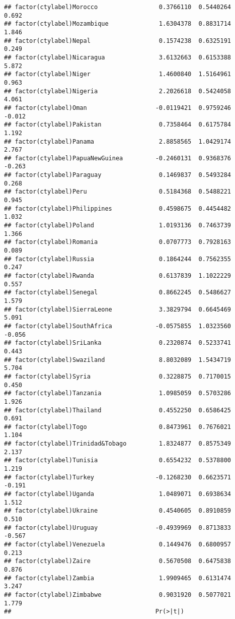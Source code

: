 \documentclass[12pt]{article}\usepackage[]{graphicx}\usepackage[]{color}
\makeatletter
\newenvironment{kframe}{%
 \def\at@end@of@kframe{}%
 \ifinner\ifhmode%
  \def\at@end@of@kframe{\end{minipage}}%
  \begin{minipage}{\columnwidth}%
 \fi\fi%
 \def\FrameCommand##1{\hskip\@totalleftmargin \hskip-\fboxsep
 \colorbox{shadecolor}{##1}\hskip-\fboxsep
     \hskip-\linewidth \hskip-\@totalleftmargin \hskip\columnwidth}%
 \MakeFramed {\advance\hsize-\width
   \@totalleftmargin\z@ \linewidth\hsize
   \@setminipage}}%
 {\par\unskip\endMakeFramed%
 \at@end@of@kframe}
\newenvironment{knitrout}{}{} %
\makeatother
\begin{document}
\begin{knitrout}
\begin{kframe}
\begin{verbatim}
## factor(ctylabel)Morocco                 0.3766110  0.5440264   0.692
## factor(ctylabel)Mozambique              1.6304378  0.8831714   1.846
## factor(ctylabel)Nepal                   0.1574238  0.6325191   0.249
## factor(ctylabel)Nicaragua               3.6132663  0.6153388   5.872
## factor(ctylabel)Niger                   1.4600840  1.5164961   0.963
## factor(ctylabel)Nigeria                 2.2026618  0.5424058   4.061
## factor(ctylabel)Oman                   -0.0119421  0.9759246  -0.012
## factor(ctylabel)Pakistan                0.7358464  0.6175784   1.192
## factor(ctylabel)Panama                  2.8858565  1.0429174   2.767
## factor(ctylabel)PapuaNewGuinea         -0.2460131  0.9368376  -0.263
## factor(ctylabel)Paraguay                0.1469837  0.5493284   0.268
## factor(ctylabel)Peru                    0.5184368  0.5488221   0.945
## factor(ctylabel)Philippines             0.4598675  0.4454482   1.032
## factor(ctylabel)Poland                  1.0193136  0.7463739   1.366
## factor(ctylabel)Romania                 0.0707773  0.7928163   0.089
## factor(ctylabel)Russia                  0.1864244  0.7562355   0.247
## factor(ctylabel)Rwanda                  0.6137839  1.1022229   0.557
## factor(ctylabel)Senegal                 0.8662245  0.5486627   1.579
## factor(ctylabel)SierraLeone             3.3829794  0.6645469   5.091
## factor(ctylabel)SouthAfrica            -0.0575855  1.0323560  -0.056
## factor(ctylabel)SriLanka                0.2320874  0.5233741   0.443
## factor(ctylabel)Swaziland               8.8032089  1.5434719   5.704
## factor(ctylabel)Syria                   0.3228875  0.7170015   0.450
## factor(ctylabel)Tanzania                1.0985059  0.5703286   1.926
## factor(ctylabel)Thailand                0.4552250  0.6586425   0.691
## factor(ctylabel)Togo                    0.8473961  0.7676021   1.104
## factor(ctylabel)Trinidad&Tobago         1.8324877  0.8575349   2.137
## factor(ctylabel)Tunisia                 0.6554232  0.5378800   1.219
## factor(ctylabel)Turkey                 -0.1268230  0.6623571  -0.191
## factor(ctylabel)Uganda                  1.0489071  0.6938634   1.512
## factor(ctylabel)Ukraine                 0.4540605  0.8910859   0.510
## factor(ctylabel)Uruguay                -0.4939969  0.8713833  -0.567
## factor(ctylabel)Venezuela               0.1449476  0.6800957   0.213
## factor(ctylabel)Zaire                   0.5670508  0.6475838   0.876
## factor(ctylabel)Zambia                  1.9909465  0.6131474   3.247
## factor(ctylabel)Zimbabwe                0.9031920  0.5077021   1.779
##                                        Pr(>|t|)    

\end{verbatim}
\end{kframe}
\end{knitrout}
\end{document}
